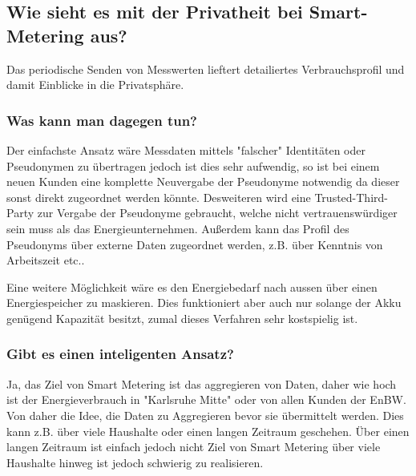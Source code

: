 	\subsection{Wie sieht es mit der Privatheit bei Smart-Metering aus?}
	Das periodische Senden von Messwerten lieftert detailiertes Verbrauchsprofil und damit Einblicke in die Privatsphäre.
	
	\subsubsection{Was kann man dagegen tun?}
	Der einfachste Ansatz wäre Messdaten mittels "falscher" Identitäten oder Pseudonymen zu übertragen jedoch ist dies sehr aufwendig, so ist bei einem neuen Kunden eine komplette Neuvergabe der Pseudonyme notwendig da dieser sonst direkt zugeordnet werden könnte. Desweiteren wird eine Trusted-Third-Party zur Vergabe der Pseudonyme gebraucht, welche nicht vertrauenswürdiger sein muss als das Energieunternehmen.
	Außerdem kann das Profil des Pseudonyms über externe Daten zugeordnet werden, z.B. über Kenntnis von Arbeitszeit etc..
	
	Eine weitere Möglichkeit wäre es den Energiebedarf nach aussen über einen Energiespeicher zu maskieren. Dies funktioniert aber auch nur solange der Akku genügend Kapazität besitzt, zumal dieses Verfahren sehr kostspielig ist.

\subsubsection{Gibt es einen inteligenten Ansatz?}
	Ja, das Ziel von Smart\- Metering ist das aggregieren von Daten, daher wie hoch ist der Energieverbrauch in "Karlsruhe\- Mitte" oder von allen Kunden der EnBW. Von daher die Idee, die Daten zu Aggregieren bevor sie übermittelt werden. Dies kann z.B. über viele Haushalte oder einen langen Zeitraum geschehen. 
	Über einen langen Zeitraum ist einfach jedoch nicht Ziel von Smart\- Metering über viele Haushalte hinweg ist jedoch schwierig zu realisieren.
